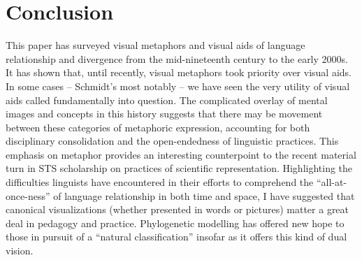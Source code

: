 \documentclass[output=paper]{langscibook}
\begin{document}
\section{Conclusion}
\label{sec:kaplan:conc}

This paper has surveyed visual metaphors and visual aids of language relationship and divergence from the mid-nineteenth century to the early 2000s. It has shown that, until recently, visual metaphors took priority over visual aids. In some cases – Schmidt's most notably – we have seen the very utility of visual aids called fundamentally into question. The complicated overlay of mental images and concepts in this history suggests that there may be movement between these categories of metaphoric expression, accounting for both disciplinary consolidation and the open-endedness of linguistic practices. This emphasis on metaphor provides an interesting counterpoint to the recent material turn in STS scholarship on practices of scientific representation. Highlighting the difficulties linguists have encountered in their efforts to comprehend the ``all-at-once-ness'' of language relationship in both time and space, I have suggested that canonical visualizations (whether presented in words or pictures) matter a great deal in pedagogy and practice. Phylogenetic modelling has offered new hope to those in pursuit of a ``natural classification'' insofar as it offers this kind of dual vision.

\sloppy
\printbibliography[heading=subbibliography,notkeyword=this]
\end{document}
